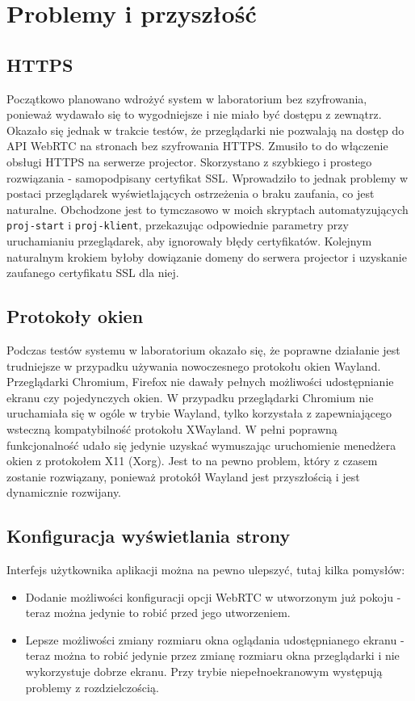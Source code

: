 \documentclass[a4paper,11pt]{article}
\begin{document}
    \section{Problemy i przyszłość}
        \subsection{HTTPS}
        Początkowo planowano wdrożyć system w laboratorium bez szyfrowania, ponieważ wydawało się to wygodniejsze i nie miało być dostępu z zewnątrz.
        Okazało się jednak w trakcie testów, że przeglądarki nie pozwalają na dostęp do API WebRTC na stronach bez szyfrowania HTTPS.
        Zmusiło to do włączenie obsługi HTTPS na serwerze projector. Skorzystano z szybkiego i prostego rozwiązania - samopodpisany certyfikat SSL.
        Wprowadziło to jednak problemy w postaci przeglądarek wyświetlających ostrzeżenia o braku zaufania, co jest naturalne. 
        Obchodzone jest to tymczasowo w moich skryptach automatyzujących \texttt{proj-start} i \texttt{proj-klient}, przekazując odpowiednie parametry przy uruchamianiu przeglądarek, aby ignorowały błędy certyfikatów.
        Kolejnym naturalnym krokiem byłoby dowiązanie domeny do serwera projector i uzyskanie zaufanego certyfikatu SSL dla niej. 
        \subsection{Protokoły okien}
        Podczas testów systemu w laboratorium okazało się, że poprawne działanie jest trudniejsze w przypadku używania nowoczesnego protokołu okien Wayland.
        Przeglądarki Chromium, Firefox nie dawały pełnych możliwości udostępnianie ekranu czy pojedynczych okien. 
        W przypadku przeglądarki Chromium nie uruchamiała się w ogóle w trybie Wayland, tylko korzystała z zapewniającego wsteczną kompatybilność protokołu XWayland.
        W pełni poprawną funkcjonalność udało się jedynie uzyskać wymuszając uruchomienie menedżera okien z protokołem X11 (Xorg).
        Jest to na pewno problem, który z czasem zostanie rozwiązany, ponieważ protokół Wayland jest przyszłością i jest dynamicznie rozwijany.
        \subsection{Konfiguracja wyświetlania strony}
        Interfejs użytkownika aplikacji można na pewno ulepszyć, tutaj kilka pomysłów: 
        \begin{itemize}
            \item Dodanie możliwości konfiguracji opcji WebRTC w utworzonym już pokoju - teraz można jedynie to robić przed jego utworzeniem.
            \item Lepsze możliwości zmiany rozmiaru okna oglądania udostępnianego ekranu - teraz można to robić jedynie przez zmianę rozmiaru okna przeglądarki i nie wykorzystuje dobrze ekranu.
        Przy trybie niepełnoekranowym występują problemy z rozdzielczością.
        \end{itemize}
\end{document}
